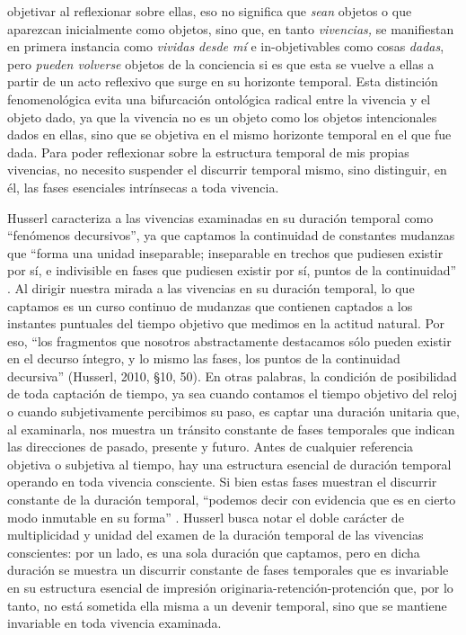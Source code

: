objetivar al reflexionar sobre ellas, eso no significa que \emph{sean}
objetos o que aparezcan inicialmente como objetos, sino que, en tanto
\emph{vivencias,} se manifiestan en primera instancia como \emph{vividas
desde mí} e in-objetivables como cosas \emph{dadas}, pero \emph{pueden
volverse} objetos de la conciencia si es que esta se vuelve a ellas a
partir de un acto reflexivo que surge en su horizonte temporal. Esta
distinción fenomenológica evita una bifurcación ontológica radical entre
la vivencia y el objeto dado, ya que la vivencia no es un objeto como
los objetos intencionales dados en ellas, sino que se objetiva en el
mismo horizonte temporal en el que fue dada. Para poder reflexionar
sobre la estructura temporal de mis propias vivencias, no necesito
suspender el discurrir temporal mismo, sino distinguir, en él, las fases
esenciales intrínsecas a toda vivencia.

Husserl caracteriza a las vivencias examinadas en su duración temporal
como ``fenómenos decursivos'', ya que captamos la continuidad de
constantes mudanzas que ``forma una unidad inseparable; inseparable en
trechos que pudiesen existir por sí, e indivisible en fases que pudiesen
existir por sí, puntos de la continuidad'' \cite[§10, p.~50]{husserl2002}. Al
dirigir nuestra mirada a las vivencias en su duración temporal, lo que
captamos es un curso continuo de mudanzas que contienen captados a los
instantes puntuales del tiempo objetivo que medimos en la actitud
natural. Por eso, ``los fragmentos que nosotros abstractamente
destacamos sólo pueden existir en el decurso íntegro, y lo mismo las
fases, los puntos de la continuidad decursiva'' (Husserl, 2010, §10,
50). En otras palabras, la condición de posibilidad de toda captación de
tiempo, ya sea cuando contamos el tiempo objetivo del reloj o cuando
subjetivamente percibimos su paso, es captar una duración unitaria que,
al examinarla, nos muestra un tránsito constante de fases temporales que
indican las direcciones de pasado, presente y futuro. Antes de cualquier
referencia objetiva o subjetiva al tiempo, hay una estructura esencial
de duración temporal operando en toda vivencia consciente. Si bien estas
fases muestran el discurrir constante de la duración temporal, ``podemos
decir con evidencia que es en cierto modo inmutable en su forma''
\cite[§10, p.~50]{husserl2002}. Husserl busca notar el doble carácter de
multiplicidad y unidad del examen de la duración temporal de las
vivencias conscientes: por un lado, es una sola duración que captamos,
pero en dicha duración se muestra un discurrir constante de fases
temporales que es invariable en su estructura esencial de impresión
originaria-retención-protención que, por lo tanto, no está sometida ella
misma a un devenir temporal, sino que se mantiene invariable en toda
vivencia examinada.

